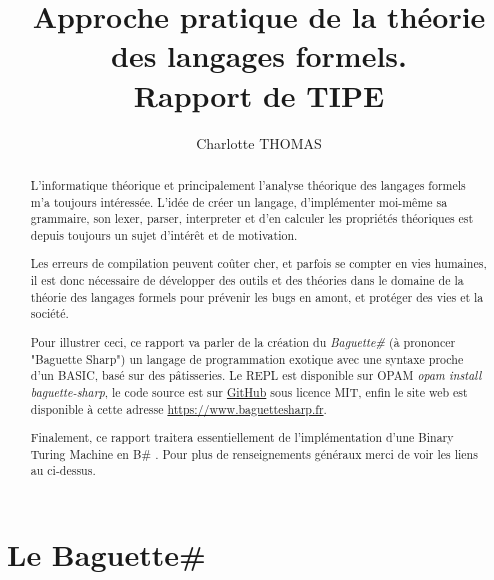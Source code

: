 \documentclass[11pt,colorlinks=true,a4paper]{article}
\title{Approche pratique de la théorie des langages formels. \\ Rapport de TIPE}
\author{Charlotte THOMAS}
\newcommand{\bsf}{Baguette\# }
\newcommand{\bs}{B\# }
\begin{document}
    \maketitle
    \begin{abstract}
        L'informatique théorique et principalement l'analyse théorique des langages formels m'a toujours intéressée.
        L'idée de créer un langage, d'implémenter moi-même sa grammaire, son lexer, parser, interpreter et d'en 
        calculer les propriétés théoriques est depuis toujours un sujet d'intérêt et de motivation.

        Les erreurs de compilation peuvent coûter cher, et parfois se compter en vies humaines, il est donc 
        nécessaire de développer des outils et des théories dans le domaine de la théorie des langages formels 
        pour prévenir les bugs en amont, et protéger des vies et la société.

        Pour illustrer ceci, ce rapport va parler de la création du \textit{\bsf} (à prononcer "Baguette Sharp") un langage 
        de programmation exotique avec une syntaxe proche d'un BASIC, basé sur des pâtisseries.
        Le REPL est disponible sur OPAM \textit{opam install baguette-sharp}, le code source est sur \href{https://github.com/coco33920/ocaml-baguettesharp-interpreter}{GitHub}
        sous licence MIT, enfin le site web est disponible à cette adresse \url{https://www.baguettesharp.fr}.

        Finalement, ce rapport traitera essentiellement de l'implémentation d'une Binary Turing Machine en \bs . Pour plus 
        de renseignements généraux merci de voir les liens au ci-dessus.
    \end{abstract}
    \tableofcontents
    \listoffigures
    \cleardoublepage


    \section{Le \bsf}
\end{document}
